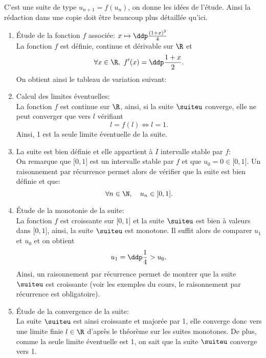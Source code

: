 \begin{correction} \;
C'est une suite de type $u_{n+1}=f(u_n)$, on donne les id\'ees de l'\'etude. Ainsi la r\'edaction dans une copie doit \^{e}tre beaucoup plus d\'etaill\'ee qu'ici.
\begin{enumerate}
 \item \'Etude de la fonction $f$ associ\'ee: $x\mapsto \ddp\frac{(1+x)^2}{4}$\\
\noindent La fonction $f$ est d\'efinie, continue et d\'erivable sur $\R$ et 
$$\forall x\in\R,\ f^{\prime}(x)=\ddp\frac{1+x}{2}.$$
On obtient ainsi le tableau de variation suivant:
\begin{center}
\end{center}
\item Calcul des limites \'eventuelles:\\
\noindent La fonction $f$ est continue sur $\R$, ainsi, si la suite $\suiteu$ converge, elle ne peut converger que vers $l$ v\'erifiant 
$$l=f(l)\Leftrightarrow l=1.$$
Ainsi, 1 est la seule limite \'eventuelle de la suite.
\item La suite est bien d\'efinie et elle appartient \`{a} $I$ intervalle stable par $f$:\\
\noindent On remarque que $\lbrack 0,1\rbrack$ est un intervalle stable par $f$ et que $u_0=0\in\lbrack 0,1\rbrack$. Un raisonnement par r\'ecurrence permet alors de v\'erifier que la suite est bien d\'efinie et que:
$$\forall n\in\N,\quad u_n\in\lbrack 0,1\rbrack.$$
\noindent 
\item \'Etude de la monotonie de la suite:\\
La fonction $f$ est croissante sur $\lbrack 0,1\rbrack$ et la suite $\suiteu$ est bien \`a valeurs dans $\lbrack 0,1\rbrack$, ainsi, la suite $\suiteu$ est monotone. Il suffit alors de comparer $u_1$ et $u_0$ et on obtient
$$u_1=\ddp\frac{1}{4}>u_0.$$
Ainsi, un raisonnement par r\'ecurrence permet de montrer que la suite $\suiteu$ est croissante (voir les exemples du cours, le raisonnement par r\'ecurrence est obligatoire).
\noindent 
\item \'Etude de la convergence de la suite:\\
\noindent La suite $\suiteu$ est ainsi croissante et major\'ee par 1, elle converge donc vers une limite finie $l\in\R$ d'apr\`es le th\'eor\`eme sur les suites monotones. De plus, comme la seule limite \'eventuelle est 1, on sait que la suite $\suiteu$ converge vers 1.
\end{enumerate}
\end{correction}